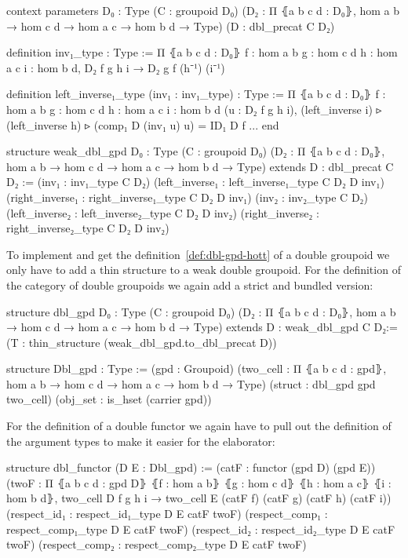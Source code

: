 \begin{leancodebr}
context
  parameters
    {D₀ : Type}
    (C : groupoid D₀)
    (D₂ : Π ⦃a b c d : D₀⦄, hom a b → hom c d → hom a c →  hom b d → Type)
    (D : dbl_precat C D₂)

  definition inv₁_type : Type :=
  Π ⦃a b c d : D₀⦄ {f : hom a b} {g : hom c d} {h : hom a c} {i : hom b d},
    D₂ f g h i → D₂ g f (h⁻¹) (i⁻¹)

  definition left_inverse₁_type (inv₁ : inv₁_type) : Type :=
  Π ⦃a b c d : D₀⦄ {f : hom a b} {g : hom c d} {h : hom a c} {i : hom b d}
    (u : D₂ f g h i),
    (left_inverse i) ▹ (left_inverse h) ▹ (comp₁ D (inv₁ u) u) = ID₁ D f
  ...
end

structure weak_dbl_gpd {D₀ : Type} (C : groupoid D₀)
  (D₂ : Π ⦃a b c d : D₀⦄, hom a b → hom c d → hom a c →  hom b d → Type)
  extends D : dbl_precat C D₂ :=
  (inv₁ : inv₁_type C D₂)
  (left_inverse₁ : left_inverse₁_type C D₂ D inv₁)
  (right_inverse₁ : right_inverse₁_type C D₂ D inv₁)
  (inv₂ : inv₂_type C D₂)
  (left_inverse₂ : left_inverse₂_type C D₂ D inv₂)
  (right_inverse₂ : right_inverse₂_type C D₂ D inv₂)
\end{leancodebr}

To implement and get the definition~\ref{def:dbl-gpd-hott} of a double
group\-oid we only have to add a thin structure to a weak double groupoid.
For the definition of the category of double group\-oids we again add a strict and
bundled version:
\begin{leancodebr}
structure dbl_gpd {D₀ : Type} (C : groupoid D₀) (D₂ : Π ⦃a b c d : D₀⦄, 
    hom a b → hom c d → hom a c →  hom b d → Type)
  extends D : weak_dbl_gpd C D₂:=
  (T : thin_structure (weak_dbl_gpd.to_dbl_precat D))

structure Dbl_gpd : Type :=
  (gpd : Groupoid)
  (two_cell : Π ⦃a b c d : gpd⦄,
    hom a b → hom c d → hom a c →  hom b d → Type)
  (struct : dbl_gpd gpd two_cell)
  (obj_set : is_hset (carrier gpd))
\end{leancodebr}

For the definition of a double functor we again have to pull out the definition
of the argument types to make it easier for the elaborator:

\begin{leancodebr}
  structure dbl_functor (D E : Dbl_gpd) :=
    (catF : functor (gpd D) (gpd E))
    (twoF : Π ⦃a b c d : gpd D⦄
      ⦃f : hom a b⦄ ⦃g : hom c d⦄ ⦃h : hom a c⦄ ⦃i : hom b d⦄,
      two_cell D f g h i → two_cell E (catF f) (catF g) (catF h) (catF i))
    (respect_id₁ : respect_id₁_type D E catF twoF)
    (respect_comp₁ : respect_comp₁_type D E catF twoF)
    (respect_id₂ : respect_id₂_type D E catF twoF)
    (respect_comp₂ : respect_comp₂_type D E catF twoF)
\end{leancodebr}

